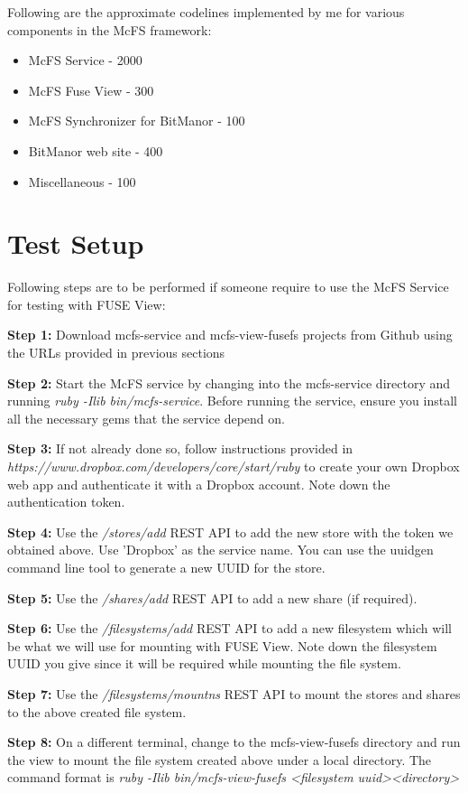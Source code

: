 Following are the approximate codelines implemented by me for various components in the McFS framework:

\begin{itemize}
	\item McFS Service - 2000
	\item McFS Fuse View - 300
	\item McFS Synchronizer for BitManor - 100
	\item BitManor web site - 400
	\item Miscellaneous - 100
\end{itemize}

\section{Test Setup}

Following steps are to be performed if someone require to use the McFS Service for testing with FUSE View:

\textbf{Step 1:} Download mcfs-service and mcfs-view-fusefs projects from Github using the URLs provided in previous sections

\textbf{Step 2:} Start the McFS service by changing into the mcfs-service directory and running \emph{ruby -Ilib bin/mcfs-service}. Before running the service, ensure you install all the necessary gems that the service depend on.
 
\textbf{Step 3:} If not already done so, follow instructions provided in \emph{https://www.dropbox.com/developers/core/start/ruby} to create your own Dropbox web app and authenticate it with a Dropbox account. Note down the authentication token.

\textbf{Step 4:} Use the \emph{/stores/add} REST API to add the new store with the token we obtained above. Use 'Dropbox' as the service name. You can use the uuidgen command line tool to generate a new UUID for the store.

\textbf{Step 5:} Use the \emph{/shares/add} REST API to add a new share (if required).

\textbf{Step 6:} Use the \emph{/filesystems/add} REST API to add a new filesystem which will be what we will use for mounting with FUSE View. Note down the filesystem UUID you give since it will be required while mounting the file system.

\textbf{Step 7:} Use the \emph{/filesystems/mountns} REST API to mount the stores and shares to the above created file system.

\textbf{Step 8:} On a different terminal, change to the mcfs-view-fusefs directory and run the view to mount the file system created above under a local directory. The command format is \emph{ruby -Ilib bin/mcfs-view-fusefs \textless filesystem uuid\textgreater \textless directory\textgreater }


